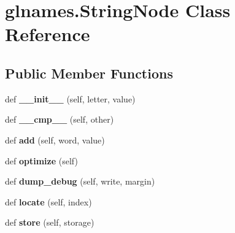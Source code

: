 \hypertarget{classglnames_1_1_string_node}{}\section{glnames.\+String\+Node Class Reference}
\label{classglnames_1_1_string_node}
\subsection*{Public Member Functions}
\begin{DoxyCompactItemize}
\item 
\mbox{\label{classglnames_1_1_string_node_a79f323cd108cae272209ab45b903e001}} 
def {\bfseries \+\_\+\+\_\+init\+\_\+\+\_\+} (self, letter, value)
\item 
\mbox{\label{classglnames_1_1_string_node_a1a43959e93f45214090f30ce6f0e030c}} 
def {\bfseries \+\_\+\+\_\+cmp\+\_\+\+\_\+} (self, other)
\item 
\mbox{\label{classglnames_1_1_string_node_aafbb6bb2e5dd17967c2f3d7394bb41ea}} 
def {\bfseries add} (self, word, value)
\item 
\mbox{\label{classglnames_1_1_string_node_a08419a249796945f53f37d66f58338af}} 
def {\bfseries optimize} (self)
\item 
\mbox{\label{classglnames_1_1_string_node_ac36f524d60f13491883a2876cc3fa55b}} 
def {\bfseries dump\+\_\+debug} (self, write, margin)
\item 
\mbox{\label{classglnames_1_1_string_node_a84c7c2b9b930fea6eff2547fa3da7124}} 
def {\bfseries locate} (self, index)
\item 
\mbox{\label{classglnames_1_1_string_node_a8e3a70942a4f6b4ca4040de2c47fc483}} 
def {\bfseries store} (self, storage)
\end{DoxyCompactItemize}
